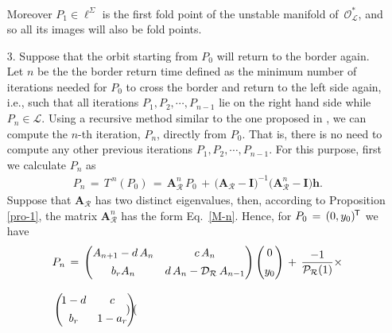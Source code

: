 \documentclass{article}
\theoremstyle{example}
\theoremstyle{plain}
\theoremstyle{definition}
\theoremstyle{remark}
\def\eqref#1{equation~\ref{#1}}
\def\vh{{\bm{h}}}
\def\mA{{\bm{A}}}
\def\mI{{\bm{I}}}
\renewcommand{\eqref}[1]{Eq.~\ref{#1}}
\newcommand*{\tran}{^{\mkern-1.5mu\mathsf{T}}}
\begin{document}
\begin{itemize}
\begin{align}
    \end{align}
    Moreover $P_1 \in \boldsymbol\ell^{\Sigma}$ is the first fold point of the unstable manifold of $\,\mathcal{O}^{*}_{\mathcal{L}}$, and so all its images will also be fold points. \\[1ex]
    \item[3.] Suppose that the orbit starting from $P_0$ will return to the border again. Let $n$ be the the border return time defined as the minimum number of iterations needed for $P_0$ to cross the border and return to the left side again, i.e., such that all iterations $P_1, P_2, \cdots, P_{n-1}$ lie on the right hand side while $P_n \in \mathcal{L}$. Using a recursive method similar to the one proposed in \citep{roy}, we can compute the $n$-th iteration, $P_n$, directly from $P_0$. That is, there is no need to compute any other previous iterations $P_1, P_2, \cdots, P_{n-1}$. For this purpose, first we calculate $P_n$ as 
\begin{align}\label{Pn}
P_n\, = \, T^{\,n}(P_0)\, = \, \mA_{\mathcal{R}}^n\,P_0 \, + \, \big( \mA_{\mathcal{R}}-\mI\big)^{-1} \big( \mA_{\mathcal{R}}^n-\mI\big) \vh.   
\end{align}
Suppose that $\mA_{\mathcal{R}}$ has two distinct eigenvalues, then, according to Proposition \ref{pro-1}, the matrix $\mA_{\mathcal{R}}^n$ has the form \eqref{M-n}. Hence, for $P_0 \, = \, (0, y_0)\tran$ we have 
\begingroup
\allowdisplaybreaks
\begin{align}\nonumber
& P_n  \, = \,  
%
\begin{pmatrix}
A_{n+1} -d\,A_n& c\, A_n \\[1ex]
%
b_r A_n &  d\,A_n - \mathcal{D}_{\mathcal{R}}\, A_{n-1}
\end{pmatrix}
%
%
\begin{pmatrix}
0\\[1ex]
y_0
\end{pmatrix}
%
 \, + \, \frac{-1}{\mathcal{P}_{\mathcal{R}}(1)} \times
\\[2ex]\nonumber
%
 & 
\begin{pmatrix}
\hspace{-.05cm}
1-d& c \\[1ex]
%
\hspace{-.05cm}
b_r &  1-a_r
\end{pmatrix}
%
\hspace{-.16cm}
%
\begin{pmatrix}

\end{pmatrix}
\end{align}
\end{itemize}
\end{document}
